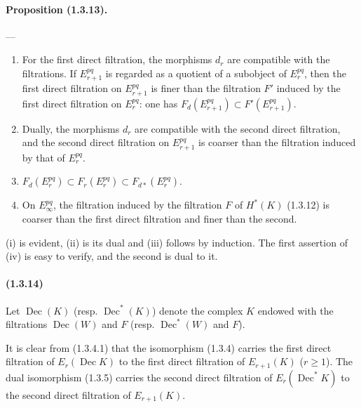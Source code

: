 \documentclass[10pt]{article}
\newcommand{\Dec}{\operatorname{Dec}}
\begin{document}
\paragraph{Proposition (1.3.13).} ---
\begin{enumerate}[label=(\roman*)]
\item For the first direct filtration, the morphisms $d_r$ are compatible with the filtrations. If $E_{r+1}^{pq}$ is regarded as a quotient of a subobject of $E_r^{pq}$, then the first direct filtration on $E_{r+1}^{pq}$ is finer than the filtration $F'$ induced by the first direct filtration on $E_r^{pq}$: one has $F_d(E_{r+1}^{pq})\subset F'(E_{r+1}^{pq})$.
\item Dually, the morphisms $d_r$ are compatible with the second direct filtration, and the second direct filtration on $E_{r+1}^{pq}$ is coarser than the filtration induced by that of $E_r^{pq}$.
\item $F_d(E_r^{pq})\subset F_r(E_r^{pq})\subset F_{d*}(E_r^{pq})$.
\item On $E_\infty^{pq}$, the filtration induced by the filtration $F$ of $H^*(K)$ (1.3.12) is coarser than the first direct filtration and finer than the second.
\end{enumerate}
(i) is evident, (ii) is its dual and (iii) follows by induction. The first assertion of (iv) is easy to verify, and the second is dual to it.

\paragraph{(1.3.14)} Let $\Dec(K)$ (resp. $\Dec^*(K)$) denote the complex $K$ endowed with the filtrations $\Dec(W)$ and $F$ (resp. $\Dec^*(W)$ and $F$).

It is clear from (1.3.4.1) that the isomorphism (1.3.4) carries the first direct filtration of $E_r(\Dec K)$ to the first direct filtration of $E_{r+1}(K)$ ($r\ge1$). The dual isomorphism (1.3.5) carries the second direct filtration of $E_r(\Dec^*K)$ to the second direct filtration of $E_{r+1}(K)$.
\end{document}
